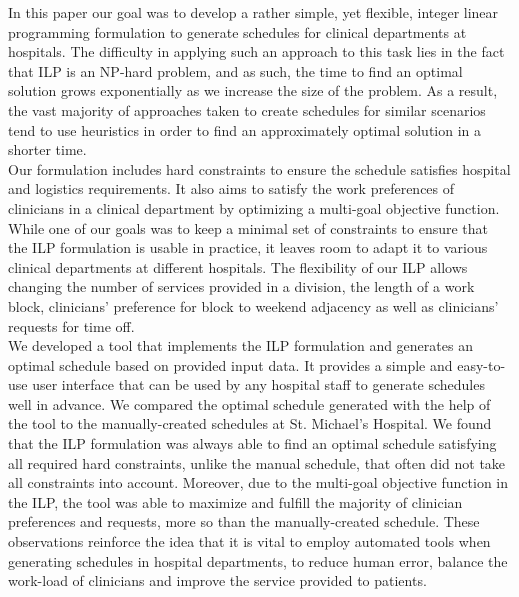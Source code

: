 In this paper our goal was to develop a rather simple, yet flexible, integer linear programming formulation to generate schedules for clinical departments at hospitals. The difficulty in applying such an approach to this task lies in the fact that ILP is an NP-hard problem, and as such, the time to find an optimal solution grows exponentially as we increase the size of the problem. As a result, the vast majority of approaches taken to create schedules for similar scenarios tend to use heuristics in order to find an approximately optimal solution in a shorter time. \\

Our formulation includes hard constraints to ensure the schedule satisfies hospital and logistics requirements. It also aims to satisfy the work preferences of clinicians in a clinical department by optimizing a multi-goal objective function. While one of our goals was to keep a minimal set of constraints to ensure that the ILP formulation is usable in practice, it leaves room to adapt it to various clinical departments at different hospitals. The flexibility of our ILP allows changing the number of services provided in a division, the length of a work block, clinicians' preference for block to weekend adjacency as well as clinicians' requests for time off. \\

We developed a tool that implements the ILP formulation and generates an optimal schedule based on provided input data. It provides a simple and easy-to-use user interface that can be used by any hospital staff to generate schedules well in advance. We compared the optimal schedule generated with the help of the tool to the manually-created schedules at St. Michael's Hospital. We found that the ILP formulation was always able to find an optimal schedule satisfying all required hard constraints, unlike the manual schedule, that often did not take all constraints into account. Moreover, due to the multi-goal objective function in the ILP, the tool was able to maximize and fulfill the majority of clinician preferences and requests, more so than the manually-created schedule. These observations reinforce the idea that it is vital to employ automated tools when generating schedules in hospital departments, to reduce human error, balance the work-load of clinicians and improve the service provided to patients. \\

